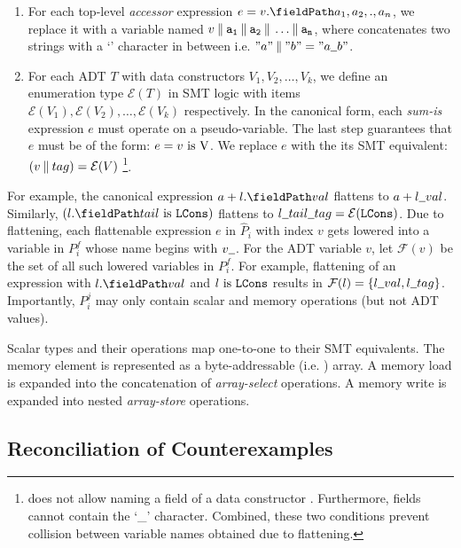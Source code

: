 \begin{enumerate}
\item For each top-level {\em accessor} expression $e = \prodAccess{v}{a_1,a_2,.,a_n}$, we replace it with a
variable named $v \mathbin\Vert{} {{\tt a_1}} \mathbin\Vert{} {{\tt a_2}} \mathbin\Vert{} \dots \mathbin\Vert{} {{\tt a_n}}$,
where \strcat{} concatenates two strings with a `\strsep{}' character in between i.e.
$"a" \strcat{} "b" = "a \strsep{} b"$.

\item For each ADT $T$ with data constructors $V_1,V_2,\dots,V_k$,
we define an enumeration type $\mathcal{E}(T)$ in SMT logic with items
$\mathcal{E}(V_1),\mathcal{E}(V_2),\dots,\mathcal{E}(V_k)$ respectively.
In the canonical form, each {\em sum-is} expression $e$ must operate on a pseudo-variable.
The last step guarantees that $e$ must be of the form: $e = v\ \mathrm{is}\ {\tt \textnormal{V}}$.
We replace $e$ with the its SMT equivalent: $(v \mathbin\Vert{} tag) = \mathcal{E}(V)$
\footnote{\SpecL{} does not allow naming a field of a data constructor .
Furthermore, fields cannot contain the `\_' character.
Combined, these two conditions prevent collision between variable names obtained due to flattening.}.
\end{enumerate}

For example, the canonical expression $a + \prodAccess{l}{val}$ flattens to $a + l \strsep{} val$.
Similarly, $(\sumIs{\prodAccess{l}{tail}}{LCons})$ flattens to $l \strsep{} tail \strsep{} tag = \mathcal{E}(\cons{LCons})$.
Due to flattening, each flattenable expression $e$ in $\hat{P}_i$ with index $v$ gets lowered
into a variable in $P_i^f$ whose name begins with $v \strsep$.
For the ADT variable $v$, let $\mathcal{F}(v)$ be the set of all such lowered variables in $P_i^f$.
For example, flattening of an expression with $\prodAccess{l}{val}$ and $l\ \mathrm{is}\ {\tt LCons}$
results in $\mathcal{F}(l) = \{ l \strsep{} val, l \strsep tag \}$.
Importantly, $P_i^j$ may only contain scalar and memory operations (but not ADT values).

Scalar types and their operations map one-to-one to their SMT equivalents.
The memory element \mem{} is represented as a byte-addressable (i.e. ) array.
A memory load  is expanded into the concatenation of  {\em array-select} operations.
A memory write  is expanded into  nested {\em array-store} operations.

\subsection{Reconciliation of Counterexamples}
\label{sec:cerecons}

